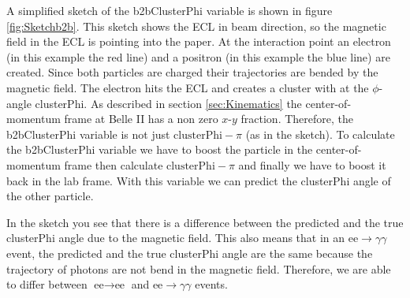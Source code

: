 \documentclass[a4paper,11pt,twosided,final,german,openbib,pdftex,listof=totoc,bibliography=totoc]{scrbook}
\begin{document}
A simplified sketch of the b2bClusterPhi variable is shown in figure \ref{fig:Sketchb2b}. This sketch shows the ECL in beam direction, so the magnetic field in the ECL is pointing into the paper. At the interaction point an electron (in this example the red line) and a positron (in this example the blue line) are created. Since both particles are charged their trajectories are bended by the magnetic field. The electron hits the ECL and creates a cluster with at the $\phi$-angle clusterPhi. As described in section \ref{sec:Kinematics} the center-of-momentum frame at Belle II has a non zero $x$-$y$ fraction. Therefore, the b2bClusterPhi variable is not just $\textrm{clusterPhi} - \pi$ (as in the sketch). To calculate the b2bClusterPhi variable we have to boost the particle in the center-of-momentum frame then calculate $\textrm{clusterPhi} - \pi$ and finally we have to boost it back in the lab frame. With this variable we can predict the clusterPhi angle of the other particle. 

In the sketch you see that there is a difference between the predicted and the true clusterPhi angle due to the magnetic field. This also means that in an $\textrm{ee} \rightarrow \gamma \gamma$ event, the predicted and the true clusterPhi angle are the same because the trajectory of photons are not bend in the magnetic field. Therefore, we are able to differ between $\textrm{ee} \rightarrow \textrm{ee}$ and $\textrm{ee} \rightarrow \gamma \gamma$ events.
\end{document}
